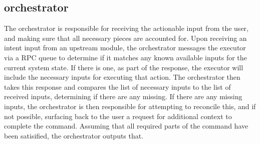 \subsection{orchestrator}

The orchestrator is responsible for receiving the actionable input from the user, and making
sure that all necessary pieces are accounted for. Upon receiving an intent input from an
upstream module, the orchestrator messages the executor via a RPC queue to determine if it
matches any known available inputs for the current system state. If there is one, as part of
the response, the executor will include the necessary inputs for executing that action. The orchestrator
then takes this response and compares the list of necessary inputs to the list of received inputs,
determining if there are any missing. If there are any missing inputs, the orchestrator is then
responsible for attempting to reconcile this, and if not possible, surfacing back to the user a
request for additional context to complete the command. Assuming that all required parts of the
command have been satisified, the orchestrator outputs that.
